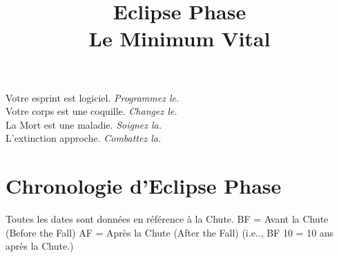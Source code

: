 \documentclass[a4paper,9pt]{article}
\begin{document}
 

\title{Eclipse Phase\\ Le Minimum Vital} \date{} 

\maketitle

\begin{center}
   Votre esprint est logiciel. \emph{Programmez le.}\\
   Votre corps est une coquille. \emph{Changez le.}\\
   La Mort est une maladie. \emph{Soignez la.}\\
   L'extinction approche. \emph{Combattez la.}\\
\end{center}

\section{Chronologie d'Eclipse Phase} \label{sec:eclipse-phase-timel} 

Toutes les dates sont données en référence à la Chute. BF = Avant la Chute
(Before the Fall) AF = Après la Chute (After the Fall) (i.e.., BF 10 = 10 ans
après la Chute.)
\end{document}
